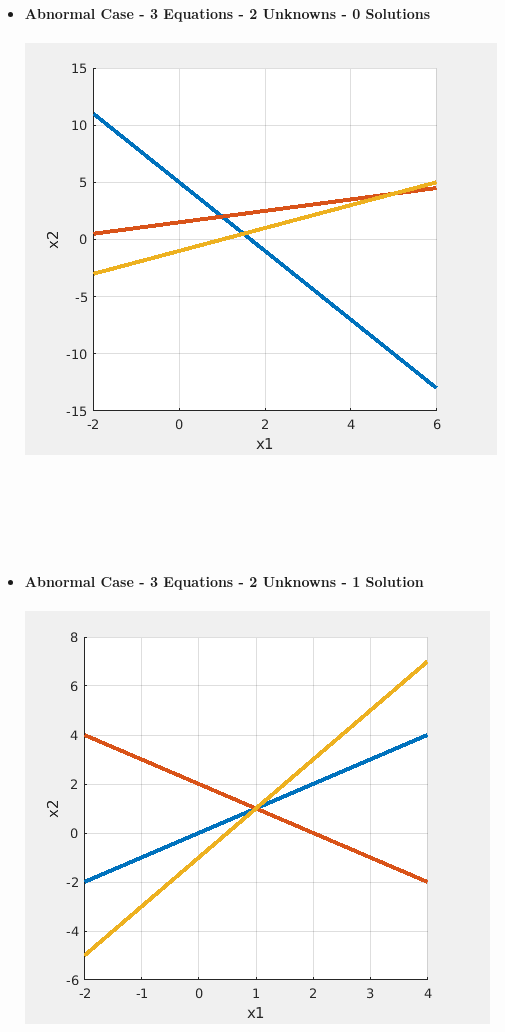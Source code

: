 \documentclass[11pt]{article}
\begin{document}
\begin{itemize}
\begin{itemize}
\newpage
\item {\bf Abnormal Case - 3 Equations - 2 Unknowns - 0 Solutions} \\\\ \includegraphics[scale=1]{lecture4_fig4.png} \\\\
\\\\
\\\\

\newpage
\item {\bf Abnormal Case - 3 Equations - 2 Unknowns - 1 Solution} \\\\ \includegraphics[scale=1]{lecture4_fig5.png} \\\\
\\\\
\\\\
\end{itemize}



\end{itemize}
\end{document}
